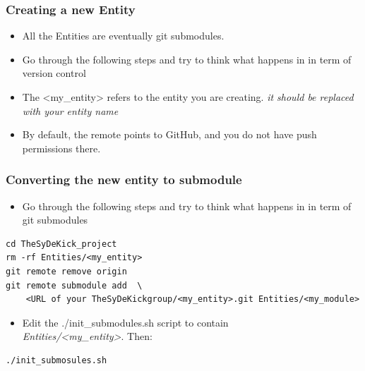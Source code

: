 \documentclass[logo=bluequo,normaltitle]{aaltoslides}
\begin{document}
\begin{frame}[t,fragile]
    \frametitle{Creating a new Entity} 
    \begin{itemize}
        \item All the Entities are eventually git submodules.
        \item Go through the following steps and try to think what happens in
            in term of version control
        \item The <my\_entity> refers to the entity you are creating. \emph{it should be
            replaced with your entity name}
        \item By default, the remote points to GitHub, and you do not have
            push permissions there.
        \end{itemize}
\end{frame}

\begin{frame}[t,fragile]
    \frametitle{Converting the new entity to submodule} 
    \begin{itemize}
        \item Go through the following steps and try to think what happens in
            in term of git submodules
    \end{itemize}
\begin{lstlisting}
cd TheSyDeKick_project
rm -rf Entities/<my_entity>
git remote remove origin
git remote submodule add  \
    <URL of your TheSyDeKickgroup/<my_entity>.git Entities/<my_module>
\end{lstlisting}
    \begin{itemize}
        \item Edit the ./init\_submodules.sh script to contain\\
            \emph{Entities/<my\_entity>}. Then:
    \end{itemize}
\begin{lstlisting}
./init_submosules.sh
\end{lstlisting}
\end{frame}
\end{document}
